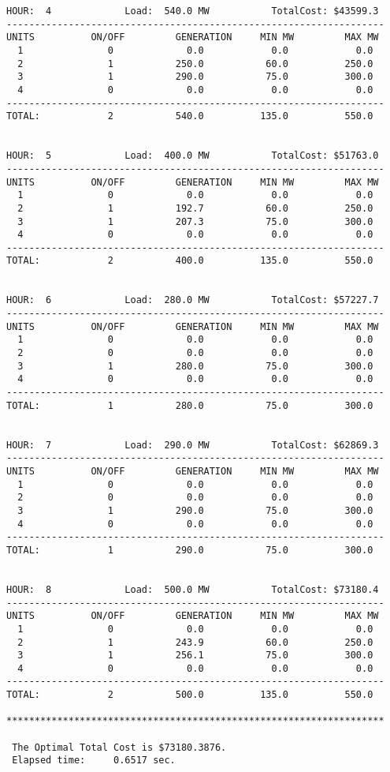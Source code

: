 \begin{verbatim}
HOUR:  4             Load:  540.0 MW           TotalCost: $43599.3
-------------------------------------------------------------------
UNITS          ON/OFF         GENERATION     MIN MW         MAX MW
  1               0             0.0            0.0            0.0
  2               1           250.0           60.0          250.0
  3               1           290.0           75.0          300.0
  4               0             0.0            0.0            0.0
-------------------------------------------------------------------
TOTAL:            2           540.0          135.0          550.0


HOUR:  5             Load:  400.0 MW           TotalCost: $51763.0
-------------------------------------------------------------------
UNITS          ON/OFF         GENERATION     MIN MW         MAX MW
  1               0             0.0            0.0            0.0
  2               1           192.7           60.0          250.0
  3               1           207.3           75.0          300.0
  4               0             0.0            0.0            0.0
-------------------------------------------------------------------
TOTAL:            2           400.0          135.0          550.0


HOUR:  6             Load:  280.0 MW           TotalCost: $57227.7
-------------------------------------------------------------------
UNITS          ON/OFF         GENERATION     MIN MW         MAX MW
  1               0             0.0            0.0            0.0
  2               0             0.0            0.0            0.0
  3               1           280.0           75.0          300.0
  4               0             0.0            0.0            0.0
-------------------------------------------------------------------
TOTAL:            1           280.0           75.0          300.0


HOUR:  7             Load:  290.0 MW           TotalCost: $62869.3
-------------------------------------------------------------------
UNITS          ON/OFF         GENERATION     MIN MW         MAX MW
  1               0             0.0            0.0            0.0
  2               0             0.0            0.0            0.0
  3               1           290.0           75.0          300.0
  4               0             0.0            0.0            0.0
-------------------------------------------------------------------
TOTAL:            1           290.0           75.0          300.0


HOUR:  8             Load:  500.0 MW           TotalCost: $73180.4
-------------------------------------------------------------------
UNITS          ON/OFF         GENERATION     MIN MW         MAX MW
  1               0             0.0            0.0            0.0
  2               1           243.9           60.0          250.0
  3               1           256.1           75.0          300.0
  4               0             0.0            0.0            0.0
-------------------------------------------------------------------
TOTAL:            2           500.0          135.0          550.0

*******************************************************************

 The Optimal Total Cost is $73180.3876.
 Elapsed time:     0.6517 sec.

\end{verbatim}

